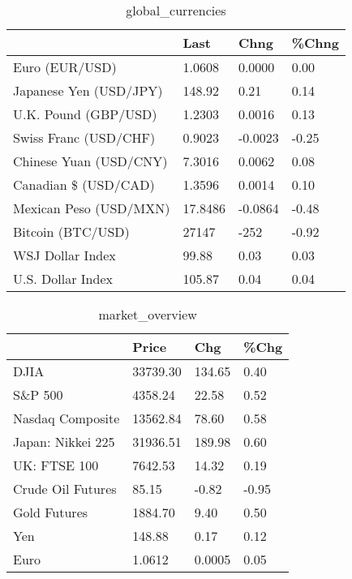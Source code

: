 \documentclass{article}%
\begin{document}
%


\begin{table}[htbp]%
\caption{global\_currencies}%
\centering%
\begin{adjustbox}{width=1\textwidth}%
\begin{tabular}{llll}
\toprule
                       &    Last &    Chng & \%Chng \\
\midrule
        Euro (EUR/USD) &  1.0608 &  0.0000 &  0.00 \\
Japanese Yen (USD/JPY) &  148.92 &    0.21 &  0.14 \\
  U.K. Pound (GBP/USD) &  1.2303 &  0.0016 &  0.13 \\
 Swiss Franc (USD/CHF) &  0.9023 & -0.0023 & -0.25 \\
Chinese Yuan (USD/CNY) &  7.3016 &  0.0062 &  0.08 \\
  Canadian \$ (USD/CAD) &  1.3596 &  0.0014 &  0.10 \\
Mexican Peso (USD/MXN) & 17.8486 & -0.0864 & -0.48 \\
     Bitcoin (BTC/USD) &   27147 &    -252 & -0.92 \\
      WSJ Dollar Index &   99.88 &    0.03 &  0.03 \\
     U.S. Dollar Index &  105.87 &    0.04 &  0.04 \\
\bottomrule
\end{tabular}
%
\end{adjustbox}%
\end{table}

%


\begin{table}[htbp]%
\caption{market\_overview}%
\centering%
\begin{adjustbox}{width=1\textwidth}%
\begin{tabular}{llll}
\toprule
                  &    Price &    Chg &  \%Chg \\
\midrule
             DJIA & 33739.30 & 134.65 &  0.40 \\
          S\&P 500 &  4358.24 &  22.58 &  0.52 \\
 Nasdaq Composite & 13562.84 &  78.60 &  0.58 \\
Japan: Nikkei 225 & 31936.51 & 189.98 &  0.60 \\
     UK: FTSE 100 &  7642.53 &  14.32 &  0.19 \\
Crude Oil Futures &    85.15 &  -0.82 & -0.95 \\
     Gold Futures &  1884.70 &   9.40 &  0.50 \\
              Yen &   148.88 &   0.17 &  0.12 \\
             Euro &   1.0612 & 0.0005 &  0.05 \\
\bottomrule
\end{tabular}
%
\end{adjustbox}%
\end{table}

%
\end{document}
